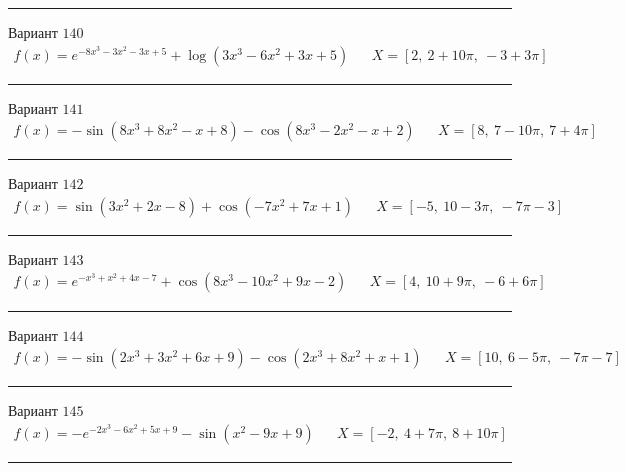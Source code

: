 \documentclass[11pt]{report}
\begin{document}
\begin{center}
    \noindent\rule{8cm}{0.4pt}
\end{center}
Вариант \(140\)
\begin{align*}
    f(x) = e^{- 8 x^{3} - 3 x^{2} - 3 x + 5} + \log{\left(3 x^{3} - 6 x^{2} + 3 x + 5 \right)} && X = \left[ 2, \  2 + 10 \pi, \  -3 + 3 \pi\right]
\end{align*}
\begin{center}
    \noindent\rule{8cm}{0.4pt}
\end{center}
Вариант \(141\)
\begin{align*}
    f(x) = - \sin{\left(8 x^{3} + 8 x^{2} - x + 8 \right)} - \cos{\left(8 x^{3} - 2 x^{2} - x + 2 \right)} && X = \left[ 8, \  7 - 10 \pi, \  7 + 4 \pi\right]
\end{align*}
\begin{center}
    \noindent\rule{8cm}{0.4pt}
\end{center}
Вариант \(142\)
\begin{align*}
    f(x) = \sin{\left(3 x^{2} + 2 x - 8 \right)} + \cos{\left(- 7 x^{2} + 7 x + 1 \right)} && X = \left[ -5, \  10 - 3 \pi, \  - 7 \pi - 3\right]
\end{align*}
\begin{center}
    \noindent\rule{8cm}{0.4pt}
\end{center}
Вариант \(143\)
\begin{align*}
    f(x) = e^{- x^{3} + x^{2} + 4 x - 7} + \cos{\left(8 x^{3} - 10 x^{2} + 9 x - 2 \right)} && X = \left[ 4, \  10 + 9 \pi, \  -6 + 6 \pi\right]
\end{align*}
\begin{center}
    \noindent\rule{8cm}{0.4pt}
\end{center}
Вариант \(144\)
\begin{align*}
    f(x) = - \sin{\left(2 x^{3} + 3 x^{2} + 6 x + 9 \right)} - \cos{\left(2 x^{3} + 8 x^{2} + x + 1 \right)} && X = \left[ 10, \  6 - 5 \pi, \  - 7 \pi - 7\right]
\end{align*}
\begin{center}
    \noindent\rule{8cm}{0.4pt}
\end{center}
Вариант \(145\)
\begin{align*}
    f(x) = - e^{- 2 x^{3} - 6 x^{2} + 5 x + 9} - \sin{\left(x^{2} - 9 x + 9 \right)} && X = \left[ -2, \  4 + 7 \pi, \  8 + 10 \pi\right]
\end{align*}
\begin{center}
    \noindent\rule{8cm}{0.4pt}
\end{center}
\end{document}

